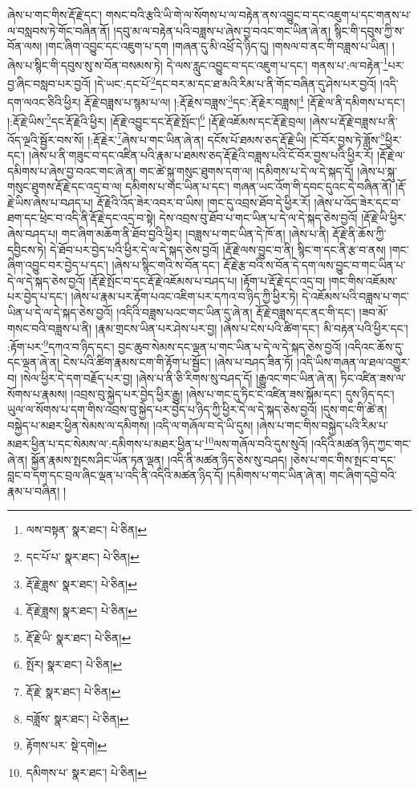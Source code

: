 ཞེས་པ་གང་གིས་རྡོ་རྗེ་དང་། གསང་བའི་རྩའི་ཡི་གེ་ལ་སོགས་པ་ལ་བརྟེན་ནས་འབྱུང་བ་དང་འཇུག་པ་དང་གནས་པ་ལ་བསླབས་ཏེ་གོང་བཞིན་ནོ། །དབུ་མ་ལ་བརྟེན་པའི་བཟླས་པ་ཞེས་བྱ་བའང་གང་ཡིན་ཞེ་ན། སྙིང་གི་དབུས་ཀྱི་ས་བོན་ལས། །གང་ཞིག་འབྱུང་དང་འཇུག་པ་དག །གཞན་དུ་མི་འཕྲོ་དེ་ཉིད་དུ། །གསལ་བ་ནང་གི་བཟླས་པ་ཡིན། །ཞེས་པ་སྙིང་གི་དབུས་སུ་ས་བོན་བསམས་ཏེ། དེ་ལས་རླུང་འབྱུང་བ་དང་འཇུག་པ་དང་། གནས་པ་:ལ་བརྟེན་\footnote{ལས་བསྟན་  སྣར་ཐང་།  པེ་ཅིན། }པར་བྱ་ཞིང་བསླབ་པར་བྱའོ། །དེ་ཡང་:དང་པོ་\footnote{དང་པོ་པ་  སྣར་ཐང་།  པེ་ཅིན། }དང་བར་མ་དང་ཐ་མའི་རིམ་པ་ནི་གོང་བཞིན་དུ་ཤེས་པར་བྱའོ། །འདི་དག་ལའང་ཅིའི་ཕྱིར། རྡོ་རྗེ་བཟླས་པ་སྙམ་པ་ལ། །:རྡོ་རྗེས་བཟླས་\footnote{རྡོ་རྗེ་ཟླས་  སྣར་ཐང་།  པེ་ཅིན། }དང་:རྡོ་རྗེར་བཟླས།\footnote{རྡོ་རྗེ་ཟླས།  སྣར་ཐང་།  པེ་ཅིན། } །རྡོ་རྗེ་ལ་ནི་དམིགས་པ་དང་། །:རྡོ་རྗེ་ཡིས་\footnote{རྡོ་རྗེ་ཡི་  སྣར་ཐང་།  པེ་ཅིན། }དང་རྡོ་རྗེའི་ཕྱིར། །རྡོ་རྗེ་འབྱུང་དང་རྡོ་རྗེ་སྤོང་།\footnote{སྤོར།  སྣར་ཐང་།  པེ་ཅིན། } །རྡོ་རྗེ་འཇོམས་དང་རྡོ་རྗེ་བྲལ། །ཞེས་པ་རྡོ་རྗེ་བཟླས་པ་ནི་འོད་ལྔའི་སྦྱོར་བས་སོ། །:རྡོ་རྗེར་\footnote{རྡོ་རྗེ་  སྣར་ཐང་།  པེ་ཅིན། }ཞེས་པ་གང་ཡིན་ཞེ་ན། དངོས་པོ་ཐམས་ཅད་རྡོ་རྗེ་ཡི། །ངོ་བོར་བྱས་ཏེ་ཟློས་\footnote{བཟློས་  སྣར་ཐང་།  པེ་ཅིན། }ཕྱིར་དང་། །ཞེས་པ་ནི་གཟུང་བ་དང་འཛིན་པའི་རྣམ་པ་ཐམས་ཅད་རྡོ་རྗེའི་བཟླས་པའི་ངོ་བོར་བྱས་པའི་ཕྱིར་རོ། །རྡོ་རྗེ་ལ་དམིགས་པ་ཞེས་བྱ་བའང་གང་ཞེ་ན། གང་ཚེ་སྐུ་གསུང་ཐུགས་དག་ལ། །དམིགས་པ་དེ་ལ་དེ་སྐད་དོ། །ཞེས་པ་སྐུ་གསུང་ཐུགས་རྡོ་རྗེ་དང་འདྲ་བ་ལ། དམིགས་པ་གང་ཡིན་པ་དང་། གཞན་ཡང་འོག་གི་དབང་དུའང་དེ་བཞིན་ནོ། །རྡོ་རྗེ་ཡིས་ཞེས་པ་བཤད་པ། རྡོ་རྗེའི་འོད་ཟེར་འབར་བ་ཡིས། །གང་དུ་འབྲས་ཐོབ་དེ་ཕྱིར་རོ། །ཞེས་པ་འོད་ཟེར་དང་བ་ཐག་དང་ཕྲེང་བ་འདི་ནི་རྡོ་རྗེ་དང་འདྲ་བ་སྟེ། དེས་འབྲས་བུ་ཐོབ་པ་གང་ཡིན་པ་དེ་ལ་དེ་སྐད་ཅེས་བྱའོ། །རྡོ་རྗེ་ཡི་ཕྱིར་ཞེས་བཤད་པ། གང་ཞིག་མཆོག་ནི་ཐོབ་བྱའི་ཕྱིར། །བཟླས་པ་གང་ཡིན་དེ་ཁོ་ན། །ཞེས་པ་ནི། རྡོ་རྗེ་ནི་ཆོས་ཀྱི་དབྱིངས་ཏེ། དེ་ཐོབ་པར་བྱེད་པའི་ཕྱིར་དེ་ལ་དེ་སྐད་ཅེས་བྱའོ། །རྡོ་རྗེ་ལས་བྱུང་བ་ནི། སྙིང་ག་དང་ནི་རྩ་བ་ནས། །གང་ཞིག་འབྱུང་བར་བྱེད་པ་དང་། །ཞེས་པ་སྙིང་གའི་ས་བོན་དང་། རྡོ་རྗེ་རྩ་བའི་ས་བོན་དེ་དག་ལས་བྱུང་བ་གང་ཡིན་པ་དེ་ལ་དེ་སྐད་ཅེས་བྱའོ། །རྡོ་རྗེ་སྤོང་བ་དང་རྡོ་རྗེ་འཇོམས་པ་བཤད་པ། །རྟོག་པ་རྡོ་རྗེ་དང་འདྲ་བ། །གང་གིས་འཇོམས་པར་བྱེད་པ་དང་། །ཞེས་པ་རྣམ་པར་རྟོག་པའང་འཇིག་པར་དཀའ་བ་ཉིད་ཀྱི་ཕྱིར་ཏེ། དེ་འཇོམས་པའི་བཟླས་པ་གང་ཡིན་པ་དེ་ལ་དེ་སྐད་ཅེས་བྱའོ། །འདིའི་བཟླས་པའང་གང་ཡིན་དུ་ཞེ་ན། རྡོ་རྗེ་བཟླས་དང་ནང་གི་དང་། །ཟབ་མོ་གསང་བའི་བཟླས་པ་ནི། །རྣམ་གྲངས་ཡིན་པར་ཤེས་པར་བྱ། །ཞེས་པ་ངེས་པའི་ཚིག་དང་། མི་བརྟན་པའི་ཕྱིར་དང་། :རྟོག་པར་\footnote{རྟོགས་པར་  སྡེ་དགེ། }དཀའ་བ་ཉིད་དང་། བྱང་ཆུབ་སེམས་དང་ལྡན་པ་གང་ཡིན་པ་དེ་ལ་དེ་སྐད་ཅེས་བྱའོ། །འདིའང་ཆོས་དུ་དང་ལྡན་ཞེ་ན། ངེས་པའི་ཚིག་རྣམས་ངག་གི་རྟོག་པ་སྦྱོང་། །ཞེས་པ་བཤད་ཟིན་ཏོ། །འདི་ཡིས་གཞན་ལ་ཐལ་འགྱུར་བ། །སེལ་ཕྱིར་དེ་དག་བརྗོད་པར་བྱ། །ཞེས་པ་ནི་ཅི་རིགས་སུ་བཤད་དོ། །རྒྱུའང་གང་ཡིན་ཞེ་ན། ཏིང་འཛིན་ཟས་ལ་སོགས་པ་རྣམས། །འབྲས་བུ་སྐྱེད་པར་བྱེད་ཕྱིར་རྒྱུ། །ཞེས་པ་གང་དུ་ཏིང་ངེ་འཛིན་ཟས་སྐོམ་དང་། དུས་ཉིད་དང་། ཡུལ་ལ་སོགས་པ་དག་གིས་འབྲས་བུ་སྐྱེད་པར་བྱེད་པ་ཉིད་ཀྱི་ཕྱིར་དེ་ལ་དེ་སྐད་ཅེས་བྱའོ། །དུས་གང་གི་ཚེ་ན། བསྐྱེད་པ་མཐར་ཕྱིན་སེམས་ལ་དམིགས། །འདི་ལ་གཞོལ་བ་དེ་ཡི་དུས། །ཞེས་པ་གང་གིས་བསྐྱེད་པའི་རིམ་པ་མཐར་ཕྱིན་པ་དང་སེམས་ལ་:དམིགས་པ་མཐར་ཕྱིན་པ་\footnote{དམིགས་པ་  སྣར་ཐང་།  པེ་ཅིན། }ལས་གཞོལ་བའི་དུས་སུའོ། །འདིའི་མཚན་ཉིད་ཀྱང་གང་ཞེ་ན། སྐྱོན་རྣམས་སྤངས་ཤིང་ཡོན་ཏན་ལྡན། །འདི་ནི་མཚན་ཉིད་ཅེས་སུ་བཤད། །ཅེས་པ་གང་གིས་སྤང་བ་དང་བླང་བ་དག་དང་བྲལ་ཞིང་ལྡན་པ་འདི་ནི་འདིའི་མཚན་ཉིད་དོ། །དམིགས་པ་གང་ཡིན་ཞེ་ན། གང་ཞིག་དབྱེ་བའི་རྣམ་པ་བཞིན། །
